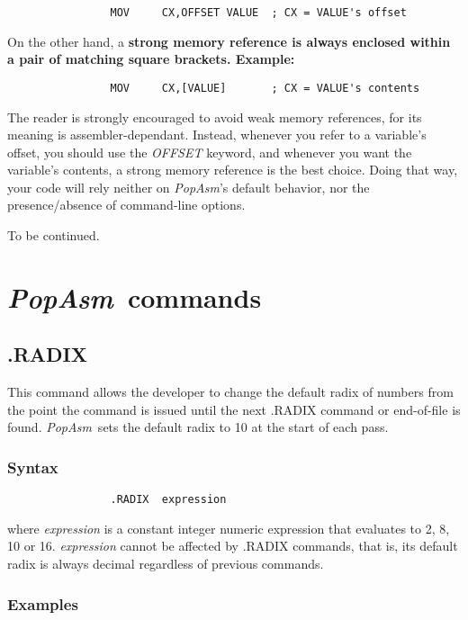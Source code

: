 \documentclass[a4paper,12pt]{book}
\newcommand{\popasm}{\emph{PopAsm}}
\begin{document}
\begin{verbatim}
                MOV     CX,OFFSET VALUE  ; CX = VALUE's offset
\end{verbatim}

On the other hand, a \bf{strong memory reference} is always enclosed within a
pair of matching square brackets. Example:

\begin{verbatim}
                MOV     CX,[VALUE]       ; CX = VALUE's contents
\end{verbatim}

The reader is strongly encouraged to avoid weak memory references, for its
meaning is assembler-dependant. Instead, whenever you refer to a variable's
offset, you should use the \emph{OFFSET} keyword, and whenever you want the
variable's contents, a strong memory reference is the best choice. Doing
that way, your code will rely neither on \popasm's default behavior, nor the
presence/absence of command-line options.

To be continued.

\chapter{\popasm\ commands}
\section{.RADIX\label{RADIXCMD}}
This command allows the developer to change the default radix of numbers
from the point the command is issued until the next .RADIX command or
end-of-file is found. \popasm\ sets the default radix to 10 at the start
of each pass.

\subsection{Syntax}

\begin{verbatim}
                .RADIX  expression
\end{verbatim}

\noindent where \emph{expression} is a constant integer numeric expression
that evaluates to 2, 8, 10 or 16. \emph{expression} cannot be affected by
.RADIX commands, that is, its default radix is always decimal regardless
of previous commands.

\subsection{Examples}
\end{document}
